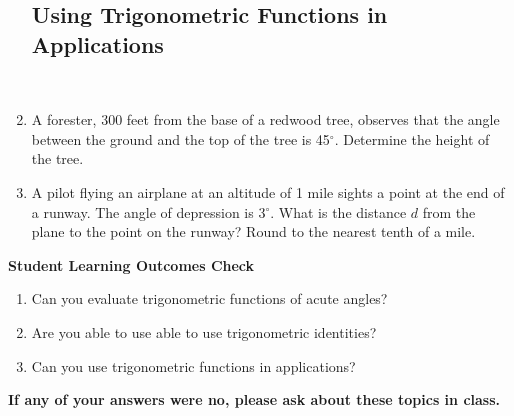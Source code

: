 \begin{enumerate}
\newpage
\subsection{Using Trigonometric Functions in Applications} ~

\item A forester, 300 feet from the base of a redwood tree, observes that the angle between the ground and the top of the tree is 45$^\circ$.  Determine the height of the tree.

\vfill
\item A pilot flying an airplane at an altitude of 1 mile sights a point at the end of a runway.  The angle of depression is 3$^\circ$.  What is the distance $d$ from the plane to the point on the runway?  Round to the nearest tenth of a mile.
\vfill
\vfill
\end{enumerate}

\noindent \textbf{Student Learning Outcomes Check}

\begin{enumerate}
\item Can you evaluate trigonometric functions of acute angles?
\item Are you able to use able to use trigonometric identities?
\item Can you use trigonometric functions in applications?
\end{enumerate}

\noindent \textbf{If any of your answers were no, please ask about these topics in class.}


